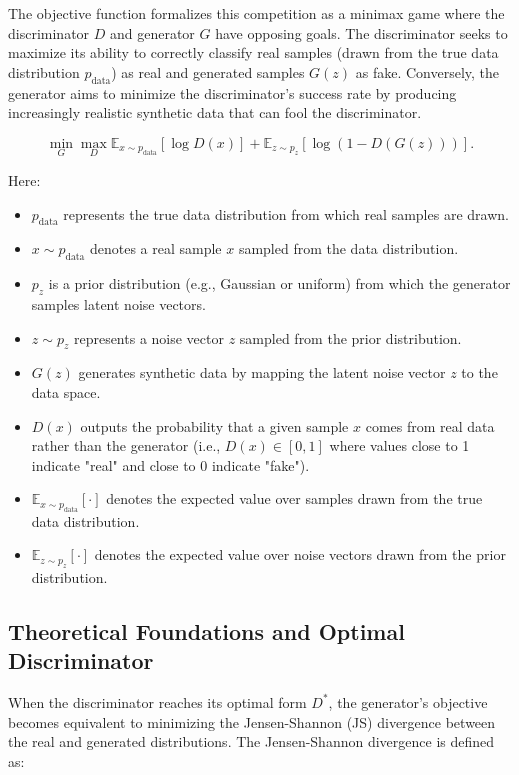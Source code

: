 The objective function formalizes this competition as a minimax game where the discriminator $D$ and generator $G$ have opposing goals.\cite{goodfellow2014generative}  The discriminator seeks to maximize its ability to correctly classify real samples (drawn from the true data distribution $p_{\text{data}}$) as real and generated samples $G(z)$ as fake. Conversely, the generator aims to minimize the discriminator's success rate by producing increasingly realistic synthetic data that can fool the discriminator.

\begin{equation}
    \min_G \max_D \mathbb{E}_{x \sim p_{\text{data}}} \left[ \log D(x) \right] + 
    \mathbb{E}_{z \sim p_z} \left[ \log (1 - D(G(z))) \right].
\end{equation}

Here:
\begin{itemize}
    \item $p_{\text{data}}$ represents the true data distribution from which real samples are drawn.
    \item $x \sim p_{\text{data}}$ denotes a real sample $x$ sampled from the data distribution.
    \item $p_z$ is a prior distribution (e.g., Gaussian or uniform) from which the generator samples latent noise vectors.
    \item $z \sim p_z$ represents a noise vector $z$ sampled from the prior distribution.
    \item $G(z)$ generates synthetic data by mapping the latent noise vector $z$ to the data space.
    \item $D(x)$ outputs the probability that a given sample $x$ comes from real data rather than the generator (i.e., $D(x) \in [0,1]$ where values close to 1 indicate "real" and close to 0 indicate "fake").
    \item $\mathbb{E}_{x \sim p_{\text{data}}}[\cdot]$ denotes the expected value over samples drawn from the true data distribution.
    \item $\mathbb{E}_{z \sim p_z}[\cdot]$ denotes the expected value over noise vectors drawn from the prior distribution.
\end{itemize}

\subsection{Theoretical Foundations and Optimal Discriminator}

When the discriminator reaches its optimal form $D^*$, the generator's objective becomes equivalent to minimizing the Jensen-Shannon (JS) divergence between the real and generated distributions. \cite{goodfellow2016tutorial} The Jensen-Shannon divergence is defined as:

